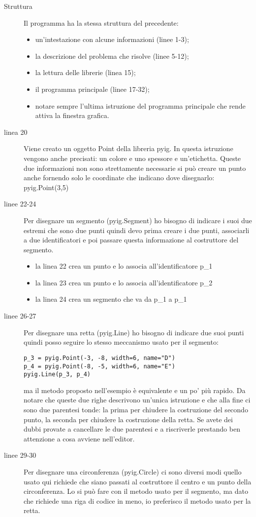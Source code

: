 \begin{description}
 \item [Struttura] 
 Il programma ha la stessa struttura del precedente:
\begin{itemize} [nosep]
 \item un'intestazione con alcune informazioni (linee 1-3); 
 \item la descrizione del problema che risolve (linee 5-12);
 \item la lettura delle librerie (linea 15);
 \item il programma principale (linee 17-32);
 \item notare sempre l'ultima istruzione del programma principale che rende 
attiva la finestra grafica.
\end{itemize}
 \item [linea 20]
 Viene creato un oggetto {\ttfamily Point} della libreria {\ttfamily pyig}. 
In questa istruzione vengono anche precisati: un colore e uno spessore e 
un'etichetta.
Queste due informazioni non sono strettamente necessarie si può creare un punto 
anche fornendo solo le coordinate che indicano dove disegnarlo:
{\ttfamily pyig.Point(3,5)}
 \item [linee 22-24]
 Per disegnare un segmento ({\ttfamily pyig.Segment}) ho bisogno di indicare i 
suoi due estremi che sono due punti quindi devo prima creare i due punti, 
associarli a due identificatori e poi passare questa informazione al costruttore 
del segmento. 
\begin{itemize} [nosep]
 \item la linea 22 crea un punto e lo associa all'identificatore 
 {\ttfamily p\_1}
 \item la linea 23 crea un punto e lo associa all'identificatore 
 {\ttfamily p\_2}
 \item la linea 24 crea un segmento che va da 
 {\ttfamily p\_1} a {\ttfamily p\_1}
\end{itemize}
 \item [linee 26-27]
 Per disegnare una retta ({\ttfamily pyig.Line}) ho bisogno di indicare due suoi
punti quindi posso seguire lo stesso meccanismo usato per il segmento:
\begin{lstlisting}
p_3 = pyig.Point(-3, -8, width=6, name="D")
p_4 = pyig.Point(-8, -5, width=6, name="E")
pyig.Line(p_3, p_4)
\end{lstlisting}
ma il metodo proposto nell'esempio è equivalente e un po' più rapido.
Da notare che queste due righe descrivono un'unica istruzione e che alla fine 
ci sono due parentesi tonde: la prima per chiudere la costruzione del secondo 
punto, la seconda per chiudere la costruzione della retta.
Se avete dei dubbi provate a cancellare le due parentesi e a riscriverle 
prestando ben attenzione a cosa avviene nell'editor.
 \item [linee 29-30]
 Per disegnare una circonferenza ({\ttfamily pyig.Circle}) ci sono diversi modi 
quello usato qui richiede che siano passati al costruttore il centro e un punto 
della circonferenza. Lo si può fare con il metodo usato per il segmento, ma 
dato che richiede una riga di codice in meno, io preferisco il metodo usato per 
la retta.
\end{description}

